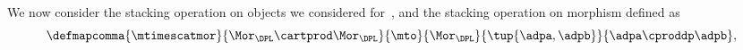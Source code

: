 
We now consider the stacking operation on objects we considered for~\PosL, and the stacking operation on morphism defined as
\begin{equation}
    \defmapcomma{
        \mtimescatmor
    }{
        \Mor_{\DPL} \cartprod \Mor_{\DPL}
    }{
        \mto
    }{
        \Mor_{\DPL}
    }{
        \tup{\adpa,\adpb}
    }{
        \adpa \cproddp \adpb
    },
\end{equation}



